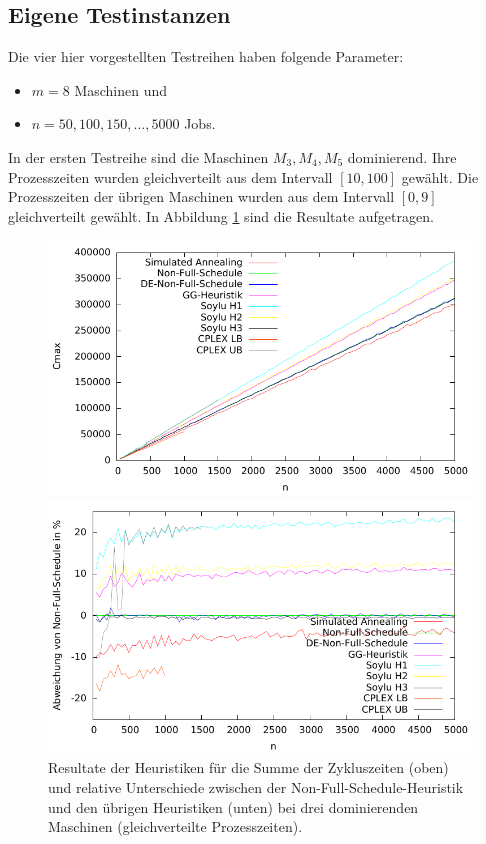 \documentclass{scrreprt}
\begin{document}
\subsection{Eigene Testinstanzen}
Die vier hier vorgestellten Testreihen haben folgende Parameter: 
\begin{itemize}
    \item $m=8$ Maschinen und 
    \item $n=50,100,150,\ldots,5000$ Jobs.
\end{itemize}
In der ersten Testreihe sind die Maschinen $M_3,M_4,M_5$ dominierend.
Ihre Prozesszeiten wurden gleichverteilt aus dem Intervall $[10,100]$ gewählt.
Die Prozesszeiten der übrigen Maschinen wurden aus dem Intervall $[0,9]$ gleichverteilt gewählt.
In Abbildung \ref{abb:3dom} sind die Resultate aufgetragen.
\begin{figure}
    \begin{center}
        \includegraphics[width=.8\textwidth]{../instances/3dom/plot.pdf}
    \end{center}
    \begin{center}
        \includegraphics[width=.8\textwidth]{../instances/3dom/plotrel.pdf}
    \end{center}
    \caption{
        \label{abb:3dom}
        Resultate der Heuristiken für die Summe der Zykluszeiten (oben) 
        und relative Unterschiede zwischen der Non-Full-Schedule-Heuristik und den übrigen Heuristiken (unten) 
        bei drei dominierenden Maschinen (gleichverteilte Prozesszeiten).
    }
\end{figure}
\end{document}
